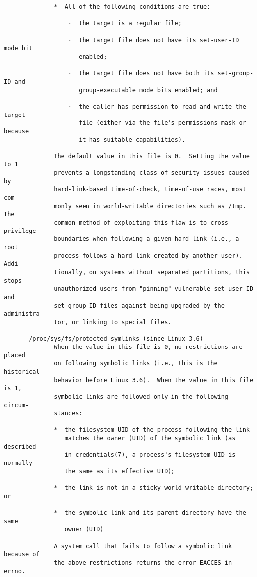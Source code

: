 \documentclass[]{article}
\begin{document}
\begin{verbatim}
              *  All of the following conditions are true:

                  ·  the target is a regular file;

                  ·  the target file does not have its set-user-ID mode bit
                     enabled;

                  ·  the target file does not have both its set-group-ID and
                     group-executable mode bits enabled; and

                  ·  the caller has permission to read and write the target
                     file (either via the file's permissions mask or because
                     it has suitable capabilities).

              The default value in this file is 0.  Setting the value to 1
              prevents a longstanding class of security issues caused by
              hard-link-based time-of-check, time-of-use races, most com‐
              monly seen in world-writable directories such as /tmp.  The
              common method of exploiting this flaw is to cross privilege
              boundaries when following a given hard link (i.e., a root
              process follows a hard link created by another user).  Addi‐
              tionally, on systems without separated partitions, this stops
              unauthorized users from "pinning" vulnerable set-user-ID and
              set-group-ID files against being upgraded by the administra‐
              tor, or linking to special files.

       /proc/sys/fs/protected_symlinks (since Linux 3.6)
              When the value in this file is 0, no restrictions are placed
              on following symbolic links (i.e., this is the historical
              behavior before Linux 3.6).  When the value in this file is 1,
              symbolic links are followed only in the following circum‐
              stances:

              *  the filesystem UID of the process following the link
                 matches the owner (UID) of the symbolic link (as described
                 in credentials(7), a process's filesystem UID is normally
                 the same as its effective UID);

              *  the link is not in a sticky world-writable directory; or

              *  the symbolic link and its parent directory have the same
                 owner (UID)

              A system call that fails to follow a symbolic link because of
              the above restrictions returns the error EACCES in errno.


\end{verbatim}
\end{document}
